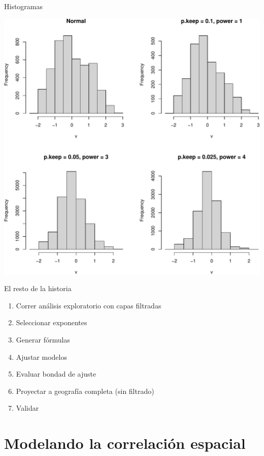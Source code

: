 \documentclass[
  11pt,
  ignorenonframetext,
]{beamer}
\providecommand{\tightlist}{%
  \setlength{\itemsep}{0pt}\setlength{\parskip}{0pt}}
\begin{document}
\begin{frame}{Histogramas}
\protect\hypertarget{histogramas}{}
\begin{center}\includegraphics{Tutorial-spatstat-2_files/figure-beamer/unnamed-chunk-25-1} \end{center}
\end{frame}

\begin{frame}{El resto de la historia}
\protect\hypertarget{el-resto-de-la-historia}{}
\begin{enumerate}
\tightlist
\item
  Correr análisis exploratorio con capas filtradas
\item
  Seleccionar exponentes
\item
  Generar fórmulas
\item
  Ajustar modelos
\item
  Evaluar bondad de ajuste
\item
  Proyectar a geografía completa (sin filtrado)
\item
  Validar
\end{enumerate}
\end{frame}

\hypertarget{modelando-la-correlaciuxf3n-espacial}{%
\section{Modelando la correlación
espacial}\label{modelando-la-correlaciuxf3n-espacial}}
\end{document}
